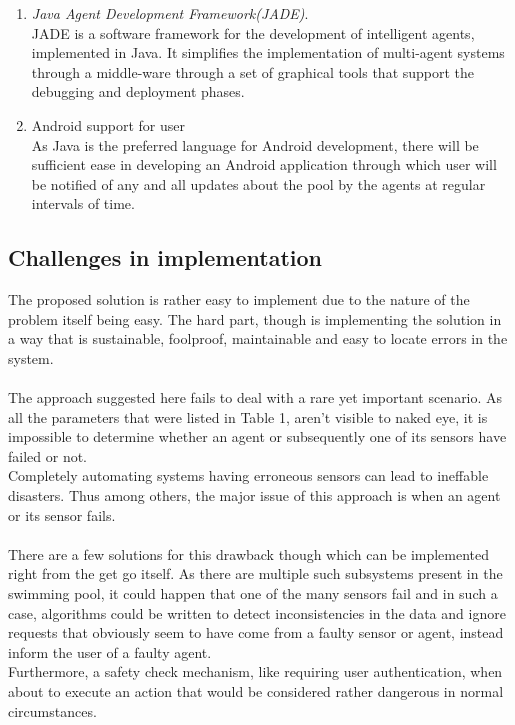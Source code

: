 \documentclass[12pt]{article}
\begin{document}
    \begin{enumerate}
        \item \textit{Java Agent Development Framework(JADE)}.\\ 
        JADE is a software framework for the development of intelligent agents, implemented in Java. It simplifies the implementation of multi-agent systems through a middle-ware through a set of graphical tools that support the debugging and deployment phases.
    
        \item Android support for user\\
        As Java is the preferred language for Android development, there will be sufficient ease in developing an Android application through which user will be notified of any and all updates about the pool by the agents at regular intervals of time. 
    \end{enumerate}
    
    \subsection{Challenges in implementation}
    The proposed solution is rather easy to implement due to the nature of the problem itself being easy. The hard part, though is implementing the solution in a way that is sustainable, foolproof, maintainable and easy to locate errors in the system.\\
    \\
    The approach suggested here fails to deal with a rare yet important scenario. As all the parameters that were listed in Table 1, aren't visible to naked eye, it is impossible to determine whether an agent or subsequently one of its sensors have failed or not.\\
    Completely automating systems having erroneous sensors can lead to ineffable disasters. Thus among others, the major issue of this approach is when an agent or its sensor fails.\\
    \\
    There are a few solutions for this drawback though which can be implemented right from the get go itself.
    As there are multiple such subsystems present in the swimming pool, it could happen that one of the many sensors fail and in such a case, algorithms could be written to detect inconsistencies in the data and ignore requests that obviously seem to have come from a faulty sensor or agent, instead inform the user of a faulty agent.\\
    Furthermore, a safety check mechanism, like requiring user authentication, when about to execute an action that would be considered rather dangerous in normal circumstances.
    
\end{document}

